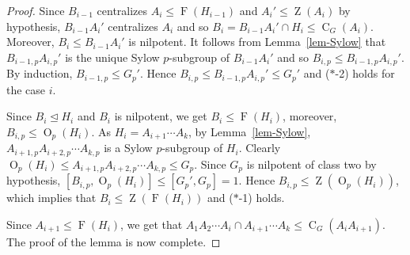 \documentclass[12pt,a4paper]{article}
\DeclareMathOperator{\Oo}{O}
\DeclareMathOperator{\C}{C}
\DeclareMathOperator{\Z}{Z}
\DeclareMathOperator{\Fit}{F}
\theoremstyle{definition}
\begin{document}
\begin{proof}
Since $B_{i-1}$ centralizes $A_i \leq \Fit(H_{i-1})$ and $A_i' \leq \Z(A_i)$ by hypothesis,
$B_{i-1}A_i'$ centralizes $A_i$ and so $B_i=B_{i-1}A_i' \cap H_i \leq \C_G(A_i)$.
Moreover, $B_i \leq B_{i-1}A_i'$ is nilpotent.
It follows from Lemma~\ref{lem-Sylow} that
$B_{i-1,p}A_{i,p}'$ is the unique Sylow $p$-subgroup of $B_{i-1}A_i'$ and so $B_{i,p} \leq B_{i-1,p}A_{i,p}'$. By induction, $B_{i-1,p} \leq G_p'$. Hence $B_{i,p} \leq B_{i-1,p}A_{i,p}' \leq G_p'$ and ($\ast$-2) holds for the case $i$.

Since $B_{i} \unlhd H_i$ and $B_i$ is nilpotent, we get $B_i \leq \Fit(H_i)$, moreover, $B_{i,p} \leq \Oo_p(H_i)$.
As $H_i=A_{i+1} \cdots A_{k}$, by Lemma~\ref{lem-Sylow}, $A_{i+1,p}A_{i+2,p} \cdots A_{k,p}$ is a Sylow $p$-subgroup of $H_i$. Clearly $\Oo_p(H_i) \leq A_{i+1,p}A_{i+2,p} \cdots A_{k,p} \leq G_p$.
Since $G_p$ is nilpotent of class two by hypothesis, $[B_{i,p}, \Oo_p(H_i)] \leq [G_p',G_p]=1$. Hence $B_{i,p} \leq \Z(\Oo_p(H_i))$, which implies that $B_i \leq \Z(\Fit(H_i))$ and ($\ast$-1) holds.

Since $A_{i+1} \leq \Fit(H_i)$, we get that
$A_1A_2\cdots A_i \cap A_{i+1}\cdots A_k \leq \C_G(A_iA_{i+1})$. The proof of the lemma is now complete.
\end{proof}
\end{document}
